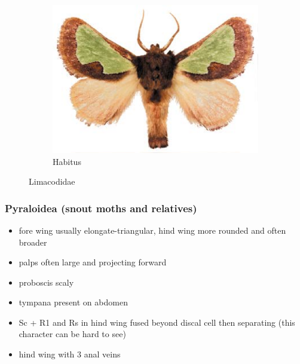 \documentclass[letterpaper, 11pt]{article}
\begin{document}
\begin{figure}[ht!]
\begin{subfigure}[ht!]{0.35\textwidth}
        \label{fig:limacodid1}
    \end{subfigure}
    \qquad %
    \begin{subfigure}[ht!]{0.48\textwidth}
        \includegraphics[width=\textwidth]{image47}
        \caption{Habitus}
        \label{fig:limacodid2}
    \end{subfigure}
    \caption{Limacodidae}\label{fig:limacodids}
\end{figure}

\subsubsection{Pyraloidea (snout moths and relatives)}
\begin{itemize}
\item fore wing usually elongate-triangular, hind wing more rounded and often broader
\item palps often large and projecting forward
\item proboscis scaly
\item tympana present on abdomen
\item Sc + R1 and Rs in hind wing fused beyond discal cell then separating (this character can be hard to see)
\item hind wing with 3 anal veins
\end{itemize}
\end{document}
